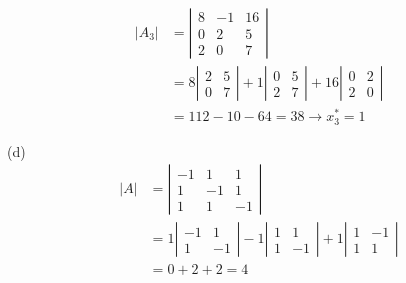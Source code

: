 \documentclass{./../../Latex/homework}
\begin{document}
\begin{enumerate}
$$
\begin{aligned}
\left|A_{3}\right| & =\left|\begin{array}{ccc}
8 & -1 & 16 \\
0 & 2 & 5 \\
2 & 0 & 7
\end{array}\right| \\
& =8\left|\begin{array}{cc}
2 & 5 \\
0 & 7
\end{array}\right|+1\left|\begin{array}{cc}
0 & 5 \\
2 & 7
\end{array}\right|+16\left|\begin{array}{ll}
0 & 2 \\
2 & 0
\end{array}\right| \\
& =112-10-64=38 \rightarrow x_{3}^{*}=1 
\end{aligned}
$$

(d) 
$$
\begin{aligned}
|A| & =\left|\begin{array}{rrr}
-1 & 1 & 1 \\
1 & -1 & 1 \\
1 & 1 & -1
\end{array}\right| \\
& =1\left|\begin{array}{rr}
-1 & 1 \\
1 & -1
\end{array}\right|-1\left|\begin{array}{rr}
1 & 1 \\
1 & -1
\end{array}\right|+1\left|\begin{array}{rr}
1 & -1 \\
1 & 1
\end{array}\right| \\
& =0+2+2=4
\end{aligned}
$$


\end{enumerate}
\end{document}

